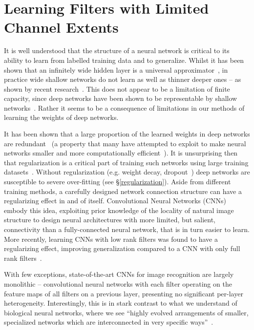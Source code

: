 \documentclass[thesis]{subfiles}
\begin{document}
	
	\chapter{Learning Filters with Limited Channel Extents}
	\label{deeproots}
	
	
	It is well understood that the structure of a neural network is critical to its ability to learn from labelled training data and to generalize. Whilst it has been shown that an infinitely wide hidden layer is a universal approximator~\citep{hornik89a}, in practice wide shallow networks do not learn as well as thinner deeper ones -- as shown by recent research~\citep{Krizhevsky2012imanet,Szegedy2014going,Simonyan2014verydeep,He2015}.
	This does not appear to be a limitation of finite capacity, since deep networks have been shown to be representable by shallow networks~\citep{Ba2013dothey}. Rather it seems to be a consequence of limitations in our methods of learning the weights of deep networks.
	
	It has been shown that a large proportion of the learned weights in deep networks are redundant~\citep{Denil2013predicting} (a property that many have attempted to exploit to make neural networks smaller and more computationally efficient~\cite{Szegedy2014going,Denton2014efficient}). It is unsurprising then that regularization is a critical part of training such networks using large training datasets~\cite{Krizhevsky2012imanet}. Without regularization (e.g. weight decay, dropout~\cite{Hinton2012}) deep networks are susceptible to severe over-fitting (see \S\ref{regularization}). Aside from different training methods, a carefully designed network connection structure can have a regularizing effect in and of itself. Convolutional Neural Networks (CNNs)~\citep{Fuk80,Lecun1998} embody this idea, exploiting prior knowledge of the locality of natural image structure to design neural architectures with more limited, but salient, connectivity than a fully-connected neural network, that is in turn easier to learn. More recently, learning CNNs with low rank filters was found to have a regularizing effect, improving generalization compared to a CNN with only full rank filters~\citep{Ioannou2016}.
	
	With few exceptions, state-of-the-art CNNs for image recognition are largely monolithic -- convolutional neural networks with each filter operating on the feature maps of all filters on a previous layer, presenting no significant per-layer heterogeneity. Interestingly, this is in stark contrast to what we understand of biological neural networks, where we see ``highly evolved arrangements of smaller, specialized networks which are interconnected in very specific ways''~\citep{minsky1988perceptrons}.
	
\end{document}
